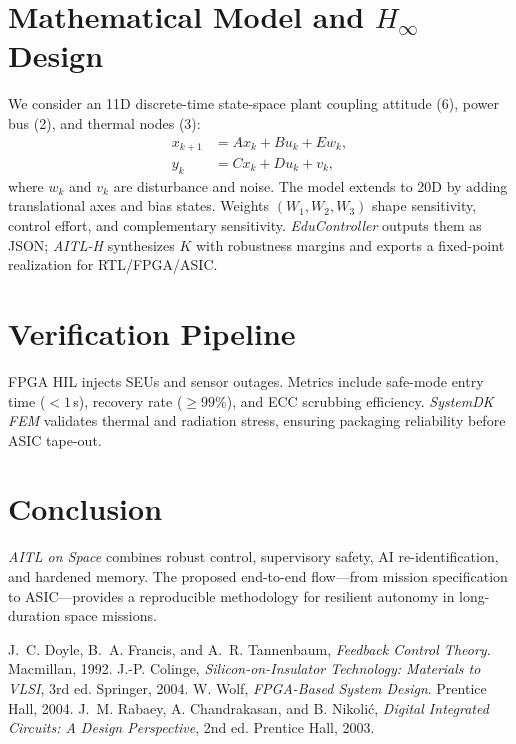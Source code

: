 \documentclass[conference]{IEEEtran}
\begin{document}
\section{Mathematical Model and $H_\infty$ Design}
We consider an 11D discrete-time state-space plant coupling attitude (6), power bus (2), and thermal nodes (3):
\begin{align}
x_{k+1} &= A x_k + B u_k + E w_k,\\
y_k     &= C x_k + D u_k + v_k,
\end{align}
where $w_k$ and $v_k$ are disturbance and noise. The model extends to 20D by adding translational axes and bias states. Weights $(W_1,W_2,W_3)$ shape sensitivity, control effort, and complementary sensitivity. \textit{EduController} outputs them as JSON; \textit{AITL-H} synthesizes $K$ with robustness margins and exports a fixed-point realization for RTL/FPGA/ASIC.

\section{Verification Pipeline}
FPGA HIL injects SEUs and sensor outages. Metrics include safe-mode entry time ($<\!1$\,s), recovery rate ($\ge 99\%$), and ECC scrubbing efficiency. \textit{SystemDK FEM} validates thermal and radiation stress, ensuring packaging reliability before ASIC tape-out.

\section{Conclusion}
\textit{AITL on Space} combines robust control, supervisory safety, AI re-identification, and hardened memory. The proposed end-to-end flow—from mission specification to ASIC—provides a reproducible methodology for resilient autonomy in long-duration space missions.


\begin{thebibliography}{4}
 J.~C. Doyle, B.~A. Francis, and A.~R. Tannenbaum, \emph{Feedback Control Theory}. Macmillan, 1992.
 J.-P. Colinge, \emph{Silicon-on-Insulator Technology: Materials to VLSI}, 3rd ed. Springer, 2004.
 W. Wolf, \emph{FPGA-Based System Design}. Prentice Hall, 2004.
 J.~M. Rabaey, A. Chandrakasan, and B. Nikolić, \emph{Digital Integrated Circuits: A Design Perspective}, 2nd ed. Prentice Hall, 2003.
\end{thebibliography}
\end{document}
